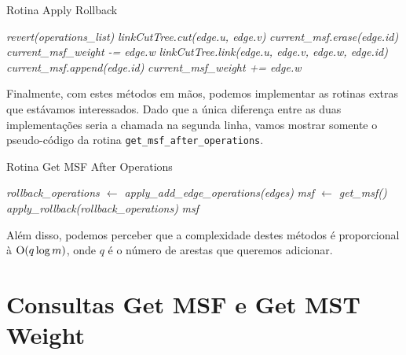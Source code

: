 \begin{algorithm}[h!]
    \caption{Rotina Apply Rollback}\label{imsf-apply-rollback}
    \begin{algorithmic}
        \State \emph{revert(operations\_list)}
        \State \emph{linkCutTree.cut(edge.u, edge.v)}
        \State \emph{current\_msf.erase(edge.id)}
        \State \emph{current\_msf\_weight -= edge.w}
        \Else
        \State \emph{linkCutTree.link(edge.u, edge.v, edge.w, edge.id)}
        \State \emph{current\_msf.append(edge.id)}
        \State \emph{current\_msf\_weight += edge.w}
        \EndIf
        \EndFor
        \EndFunction
    \end{algorithmic}
\end{algorithm}

Finalmente, com estes métodos em mãos, podemos implementar as rotinas extras que estávamos interessados. Dado que a única diferença entre as duas implementações seria a chamada na segunda linha, vamos mostrar somente o pseudo-código da rotina \texttt{get\_msf\_after\_operations}.

\begin{algorithm}[h!]
    \caption{Rotina Get MSF After Operations}\label{imsf-msf-after}
    \begin{algorithmic}
        \State \emph{rollback\_operations $\gets$ apply\_add\_edge\_operations(edges)}
        \State \emph{msf $\gets$ get\_msf()}
        \State \emph{apply\_rollback(rollback\_operations)}
        \State \Return \emph{msf}
        \EndFunction
    \end{algorithmic}
\end{algorithm}

Além disso, podemos perceber que a complexidade destes métodos é proporcional à $\mathrm{O}(q \log m)$, onde $q$ é o número de arestas que queremos adicionar.


\section{Consultas Get MSF e Get MST Weight}
\label{sec:rmsf-get-msf}



